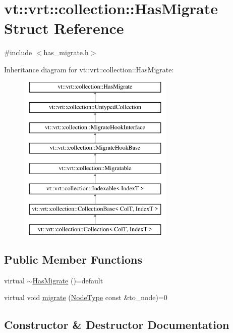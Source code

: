 \hypertarget{structvt_1_1vrt_1_1collection_1_1_has_migrate}{}\section{vt\+:\+:vrt\+:\+:collection\+:\+:Has\+Migrate Struct Reference}
\label{structvt_1_1vrt_1_1collection_1_1_has_migrate}


{\ttfamily \#include $<$has\+\_\+migrate.\+h$>$}

Inheritance diagram for vt\+:\+:vrt\+:\+:collection\+:\+:Has\+Migrate\+:\begin{figure}[H]
\begin{center}
\leavevmode
\includegraphics[height=8.000000cm]{structvt_1_1vrt_1_1collection_1_1_has_migrate}
\end{center}
\end{figure}
\subsection*{Public Member Functions}
\begin{DoxyCompactItemize}
\item 
virtual \hyperlink{structvt_1_1vrt_1_1collection_1_1_has_migrate_af96b4c05d2d3ed56d79641915475192f}{$\sim$\+Has\+Migrate} ()=default
\item 
virtual void \hyperlink{structvt_1_1vrt_1_1collection_1_1_has_migrate_a6cd6f43660771bf45e205e4c8ee7ff90}{migrate} (\hyperlink{namespacevt_a866da9d0efc19c0a1ce79e9e492f47e2}{Node\+Type} const \&to\+\_\+node)=0
\end{DoxyCompactItemize}


\subsection{Constructor \& Destructor Documentation}
\mbox{\label{structvt_1_1vrt_1_1collection_1_1_has_migrate_af96b4c05d2d3ed56d79641915475192f}} 
